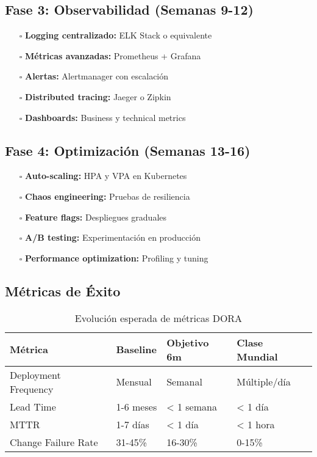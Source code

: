 \documentclass[12pt,a4paper]{article}
\begin{document}
\subsection{Fase 3: Observabilidad (Semanas 9-12)}
\begin{itemize}
    \item[$\square$] \textbf{Logging centralizado:} ELK Stack o equivalente
    \item[$\square$] \textbf{Métricas avanzadas:} Prometheus + Grafana
    \item[$\square$] \textbf{Alertas:} Alertmanager con escalación
    \item[$\square$] \textbf{Distributed tracing:} Jaeger o Zipkin
    \item[$\square$] \textbf{Dashboards:} Business y technical metrics
\end{itemize}

\subsection{Fase 4: Optimización (Semanas 13-16)}
\begin{itemize}
    \item[$\square$] \textbf{Auto-scaling:} HPA y VPA en Kubernetes
    \item[$\square$] \textbf{Chaos engineering:} Pruebas de resiliencia
    \item[$\square$] \textbf{Feature flags:} Despliegues graduales
    \item[$\square$] \textbf{A/B testing:} Experimentación en producción
    \item[$\square$] \textbf{Performance optimization:} Profiling y tuning
\end{itemize}

\subsection{Métricas de Éxito}
\begin{table}[h!]
\centering
\begin{tabular}{|l|l|l|l|}
\hline
\textbf{Métrica} & \textbf{Baseline} & \textbf{Objetivo 6m} & \textbf{Clase Mundial} \\
\hline
Deployment Frequency & Mensual & Semanal & Múltiple/día \\
\hline
Lead Time & 1-6 meses & < 1 semana & < 1 día \\
\hline
MTTR & 1-7 días & < 1 día & < 1 hora \\
\hline
Change Failure Rate & 31-45\% & 16-30\% & 0-15\% \\
\hline
\end{tabular}
\caption{Evolución esperada de métricas DORA}
\end{table}
\end{document}
